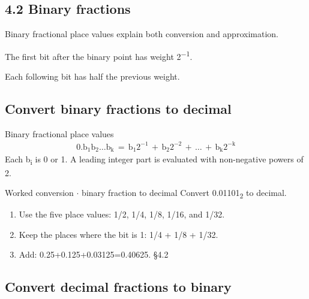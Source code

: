 \documentclass[11pt]{article}
\begin{document}
\begin{keepsection}
\section{4.2 Binary fractions}

Binary fractional place values explain both conversion and approximation.

The first bit after the binary point has weight 2\textsuperscript{\ensuremath{-}1}.

Each following bit has half the previous weight.

\begin{keepsection}
\subsection{Convert binary fractions to decimal}

\begin{equationcard}{Binary fractional place values}
\[ \begin{gathered} 0.\mathrm{b}_{1}\mathrm{b}_{2}…\mathrm{b}_{\mathrm{k}}\, =\, \mathrm{b}_{1}2^{-1}\, +\, \mathrm{b}_{2}2^{-2}\, +\, …\, +\, \mathrm{b}_{\mathrm{k}}2^{-\mathrm{k}} \end{gathered} \]
{\small Each b\textsubscript{i} is 0 or 1. A leading integer part is evaluated with non-negative powers of 2.}
\end{equationcard}

\begin{workedbox}{Worked conversion \ensuremath{\cdot} binary fraction to decimal}
Convert 0.01101\textsubscript{2} to decimal.

\begin{enumerate}
\item Use the five place values: 1/2, 1/4, 1/8, 1/16, and 1/32.
\item Keep the places where the bit is 1: 1/4 + 1/8 + 1/32.
\item Add: 0.25+0.125+0.03125=0.40625. \hfill{\small\color{FAUblue}§4.2}
\end{enumerate}
\end{workedbox}
\end{keepsection}

\begin{keepsection}
\subsection{Convert decimal fractions to binary}


\end{keepsection}
\end{keepsection}
\end{document}
